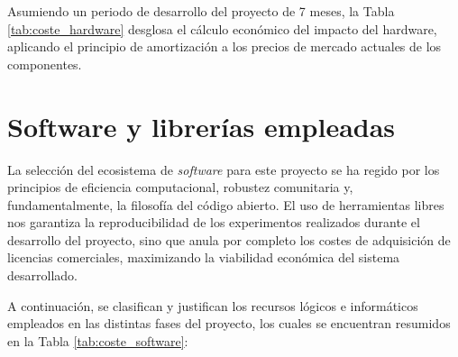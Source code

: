 \documentclass[12pt,a4paper,onecolumn,oneside]{report}
\begin{document}
Asumiendo un periodo de desarrollo del proyecto de 7 meses, la Tabla \ref{tab:coste_hardware} desglosa el cálculo económico del impacto del hardware, aplicando el principio de amortización a los precios de mercado actuales de los componentes.

\begin{table}[htbp]
\centering
\small
{}
\caption{Desglose de costes y amortización del hardware del proyecto.}
\label{tab:coste_hardware}
\end{table}
\section{Software y librerías empleadas}

La selección del ecosistema de \textit{software} para este proyecto se ha regido por los principios de eficiencia computacional, robustez comunitaria y, fundamentalmente, la filosofía del código abierto. El uso de herramientas libres nos garantiza la reproducibilidad de los experimentos realizados durante el desarrollo del proyecto, sino que anula por completo los costes de adquisición de licencias comerciales, maximizando la viabilidad económica del sistema desarrollado.

A continuación, se clasifican y justifican los recursos lógicos e informáticos empleados en las distintas fases del proyecto, los cuales se encuentran resumidos en la Tabla \ref{tab:coste_software}:
\end{document}

